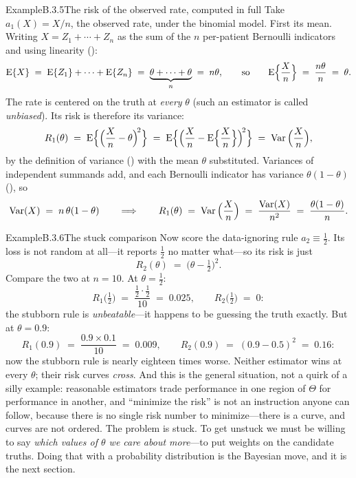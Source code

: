 \documentclass[main.tex]{subfiles}
\begin{document}
\begin{ObjL}{Example}{B.3.5}{The risk of the observed rate, computed in full}
Take $a_1(X)=X/n$, the observed rate, under the binomial model. First its mean. Writing
$X=Z_1+\cdots+Z_n$ as the sum of the $n$ per-patient Bernoulli indicators and using
linearity ():
\[ \mathrm{E}\{X\} \;=\; \mathrm{E}\{Z_1\} + \cdots + \mathrm{E}\{Z_n\} \;=\; \underbrace{\theta+\cdots+\theta}_{n}
   \;=\; n\theta ,
   \qquad\text{so}\qquad
   \mathrm{E}\Big\{\frac{X}{n}\Big\} \;=\; \frac{n\theta}{n} \;=\; \theta . \]
The rate is centered on the truth at \emph{every} $\theta$ (such an estimator is called
\emph{unbiased}). Its risk is therefore its variance:
\[ R_1(\theta) \;=\; \mathrm{E}\Big\{ \Big(\frac{X}{n}-\theta\Big)^{\!2} \Big\}
   \;=\; \mathrm{E}\Big\{ \Big(\frac{X}{n}-\mathrm{E}\Big\{\frac{X}{n}\Big\}\Big)^{\!2} \Big\}
   \;=\; \operatorname{Var}\Big(\frac{X}{n}\Big) , \]
by the definition of variance () with the mean $\theta$ substituted. Variances
of independent summands add, and each Bernoulli indicator has
variance $\theta(1-\theta)$ (), so
\[ \operatorname{Var}(X) \;=\; n\,\theta(1-\theta)
   \qquad\Longrightarrow\qquad
   R_1(\theta) \;=\; \operatorname{Var}\Big(\frac{X}{n}\Big) \;=\; \frac{\operatorname{Var}(X)}{n^2}
   \;=\; \frac{\theta(1-\theta)}{n} . \]
\end{ObjL}

\begin{ObjL}{Example}{B.3.6}{The stuck comparison}
Now score the data-ignoring rule $a_2\equiv\tfrac12$. Its loss is not random at all---it
reports $\tfrac12$ no matter what---so its risk is just
\[ R_2(\theta) \;=\; \big(\theta - \tfrac12\big)^2 . \]
Compare the two at $n=10$. At $\theta=\tfrac12$:
\[ R_1\big(\tfrac12\big) \;=\; \frac{\tfrac12\cdot\tfrac12}{10} \;=\; 0.025 ,
   \qquad
   R_2\big(\tfrac12\big) \;=\; 0 : \]
the stubborn rule is \emph{unbeatable}---it happens to be guessing the truth exactly. But at
$\theta=0.9$:
\[ R_1(0.9) \;=\; \frac{0.9\times0.1}{10} \;=\; 0.009 ,
   \qquad
   R_2(0.9) \;=\; (0.9-0.5)^2 \;=\; 0.16 : \]
now the stubborn rule is nearly eighteen times worse. Neither estimator wins at every
$\theta$; their risk curves \emph{cross}. And this is the general situation, not a quirk of
a silly example: reasonable estimators trade performance in one region of $\Theta$ for
performance in another, and ``minimize the risk'' is not an instruction anyone can follow,
because there is no single risk number to minimize---there is a curve, and curves are not
ordered. The problem is stuck. To get unstuck we must be willing to say \emph{which values
of $\theta$ we care about more}---to put weights on the candidate truths. Doing that with a
probability distribution is the Bayesian move, and it is the next section.
\end{ObjL}
\end{document}
